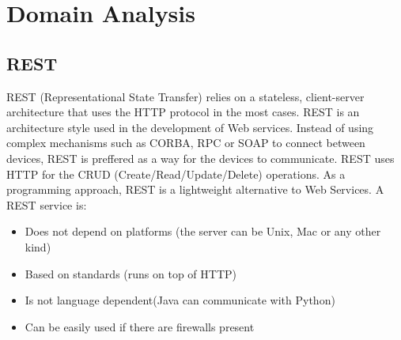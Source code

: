 \section{Domain Analysis}

\subsection{REST}
REST (Representational State Transfer) relies on a stateless, client-server architecture that uses the HTTP protocol in the most cases.
REST is an architecture style used in the development of Web services. Instead of using complex mechanisms such as CORBA, RPC or SOAP to connect between devices, REST is preffered as a way for the devices to communicate.
REST uses HTTP for the CRUD (Create/Read/Update/Delete) operations.
As a programming approach, REST is a lightweight alternative to Web Services.
A REST service is:
\begin{itemize}
  \item Does not depend on platforms (the server can be Unix, Mac or any other kind)
  \item Based on standards (runs on top of HTTP)
  \item Is not language dependent(Java can communicate with Python)
  \item Can be easily used if there are firewalls present
\end{itemize}


